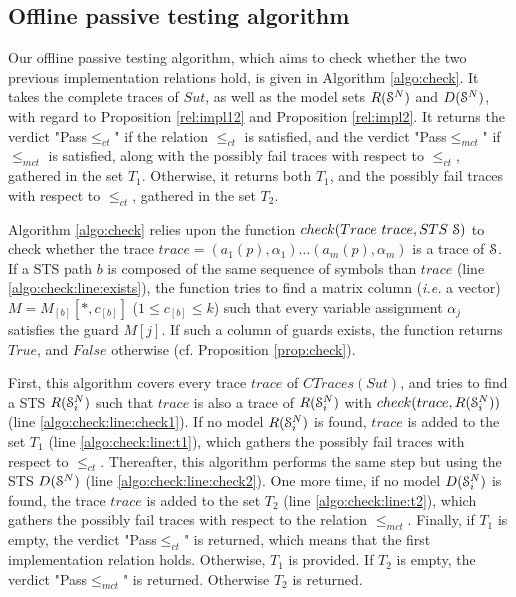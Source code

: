 \subsection{Offline passive testing algorithm}
\label{sec:testing:offline}

Our offline passive testing algorithm, which aims to check
whether the two previous implementation relations hold, is given
in Algorithm \ref{algo:check}. It takes the complete traces of
$\mathit{Sut}$, as well as the model sets $R(\EuScript{S}^{N})$ and
$D(\EuScript{S}^{N})$, with regard to Proposition
\ref{rel:impl12} and Proposition \ref{rel:impl2}. It returns the
verdict "Pass$\leq_{ct}$" if the relation $\leq_{ct}$ is
satisfied, and the verdict "Pass$\leq_{mct}$" if $\leq_{mct}$ is
satisfied, along with the possibly fail traces with respect to
$\leq_{ct}$, gathered in the set $T_1$. Otherwise, it returns
both $T_1$, and the possibly fail traces with respect to
$\leq_{ct}$, gathered in the set $T_2$.

Algorithm \ref{algo:check} relies upon the function ${check(Trace
~trace, STS ~\EuScript{S})}$ to check whether the trace $trace =
(a_1(p), \alpha_1) \dots (a_m(p), \alpha_m)$ is a trace of
$\EuScript{S}$. If a STS path $b$ is composed of the same
sequence of symbols than $trace$ (line
\ref{algo:check:line:exists}), the function tries to find a
matrix column (\emph{i.e.} a vector) $M = M_{[b]}[*,c_{[b]}]$ ($1
\leq c_{[b]} \leq k$) such that every variable assignment
$\alpha_j$ satisfies the guard $M[j]$. If such a column of guards
exists, the function returns $True$, and $False$ otherwise (cf.
Proposition \ref{prop:check}).

First, this algorithm covers every trace $trace$ of
$CTraces({Sut})$, and tries to find a STS $R(\EuScript{S}_i^{N})$
such that $trace$ is also a trace of $R(\EuScript{S}_i^{N})$ with
$check(trace, R(\EuScript{S}_i^{N}))$ (line
\ref{algo:check:line:check1}).  If no model
$R(\EuScript{S}_i^{N})$ is found, $trace$ is added to the set
$T_1$ (line \ref{algo:check:line:t1}), which gathers the possibly
fail traces with respect to $\leq_{ct}$.
Thereafter, this algorithm performs the same step but using the
STS $D(\EuScript{S}^{N})$ (line \ref{algo:check:line:check2}).
One more time, if no model $D(\EuScript{S}_i^{N})$ is found, the
trace $trace$ is added to the set $T_2$ (line
\ref{algo:check:line:t2}), which gathers the possibly fail
traces with respect to the relation $\leq_{mct}$.
Finally, if $T_1$ is empty, the verdict "Pass$\leq_{ct}$" is
returned, which means that the first implementation relation
holds. Otherwise, $T_1$ is provided. If $T_2$ is empty, the
verdict "Pass$\leq_{mct}$" is returned. Otherwise $T_2$ is
returned.

